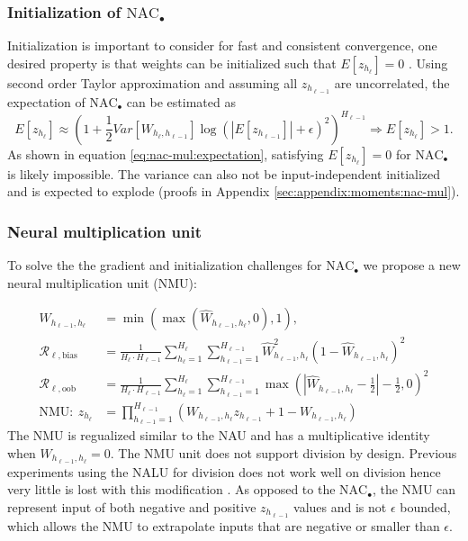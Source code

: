 \subsubsection{Initialization of $\mathrm{NAC}_{\bullet}$}
Initialization is important to consider for fast and consistent convergence, one desired property is that weights can be initialized such that $E[z_{h_\ell}] = 0$ \cite{glorot-initialization}. Using second order Taylor approximation and assuming all $z_{h_{\ell-1}}$ are uncorrelated, the expectation of $\mathrm{NAC}_{\bullet}$ can be estimated as
\begin{equation}
E[z_{h_\ell}] \approx \left(1 + \frac{1}{2} Var[W_{h_\ell, h_{\ell-1}}] \log(|E[z_{h_{\ell-1}}]| + \epsilon)^2\right)^{H_{\ell-1}} \Rightarrow E[z_{h_\ell}] > 1.
\label{eq:nac-mul:expectation}
\end{equation}
As shown in equation \ref{eq:nac-mul:expectation}, satisfying $E[z_{h_\ell}] = 0$ for $\mathrm{NAC}_{\bullet}$ is likely impossible. The variance can also not be input-independent initialized and is expected to explode (proofs in Appendix \ref{sec:appendix:moments:nac-mul}).

\subsubsection{Neural multiplication unit}
To solve the the gradient and initialization challenges for $\mathrm{NAC}_{\bullet}$ we propose a new neural multiplication unit (NMU):

\begin{align}
W_{h_{\ell-1},h_\ell} &= \min(\max(\hat{W}_{h_{\ell-1},h_\ell}, 0), 1), \\
\mathcal{R}_{\ell,\mathrm{bias}} &= \frac{1}{H_\ell \cdot H_{\ell-1}} \sum_{h_\ell=1}^{H_\ell} \sum_{h_{\ell-1}=1}^{H_{\ell-1}} \hat{W}_{h_{\ell-1},h_\ell}^2 (1 - \hat{W}_{h_{\ell-1},h_\ell})^2 \\
\mathcal{R}_{\ell,\mathrm{oob}} &= \frac{1}{H_\ell \cdot H_{\ell-1}} \sum_{h_\ell=1}^{H_\ell} \sum_{h_{\ell-1}=1}^{H_{\ell-1}} \max\left(\left|\hat{W}_{h_{\ell-1},h_\ell} - \frac{1}{2}\right| - \frac{1}{2}, 0\right)^2 \\
\textrm{NMU}:\ z_{h_\ell} &= \prod_{h_{\ell-1}=1}^{H_{\ell-1}} \left(W_{h_{\ell-1},h_\ell} z_{h_{\ell-1}} + 1 - W_{h_{\ell-1},h_\ell} \right) \label{eq:nmu-defintion}
\end{align}
The NMU is regualized similar to the NAU and has a multiplicative identity when $W_{h_{\ell-1},h_\ell}=0$.
The NMU unit does not support division by design.
Previous experiments using the NALU for division does not work well on division hence very little is lost with this modification \cite{trask-nalu}.
As opposed to the $\mathrm{NAC}_{\bullet}$, the NMU can represent input of both negative and positive $z_{h_{\ell-1}}$ values and is not $\epsilon$ bounded, which allows the NMU to extrapolate inputs that are negative or smaller than $\epsilon$.


